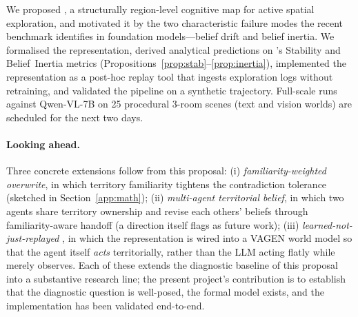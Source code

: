 We proposed \tb, a structurally region-level cognitive map for active
spatial exploration, and motivated it by the two characteristic
failure modes the recent \tos benchmark identifies in foundation
models---belief drift and belief inertia. We formalised the
representation, derived analytical predictions on \tos's Stability
and Belief~Inertia metrics
(Propositions~\ref{prop:stab}--\ref{prop:inertia}), implemented the
representation as a post-hoc replay tool that ingests \tos
exploration logs without retraining, and validated the pipeline on a
synthetic trajectory. Full-scale runs against Qwen-VL-7B on 25
procedural 3-room scenes (text and vision worlds) are scheduled for
the next two days.

\paragraph{Looking ahead.}
Three concrete extensions follow from this proposal:
(i) \emph{familiarity-weighted overwrite}, in which territory
familiarity tightens the contradiction tolerance (sketched in
Section~\ref{app:math});
(ii) \emph{multi-agent territorial belief}, in which two agents share
territory ownership and revise each others' beliefs through
familiarity-aware handoff (a direction \tos itself flags as
future work);
(iii) \emph{learned-not-just-replayed} \tb, in which the
representation is wired into a VAGEN \citep{wang2025vagen} world
model so that the agent itself \emph{acts} territorially, rather than
the LLM acting flatly while \tb merely observes. Each of these
extends the diagnostic baseline of this proposal into a substantive
research line; the present project's contribution is to establish
that the diagnostic question is well-posed, the formal model exists,
and the implementation has been validated end-to-end.
